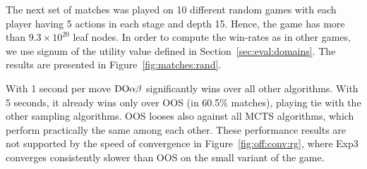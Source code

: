 The next set of matches was played on 10 different random games with each player having 5 actions in each stage and depth 15. Hence, the game has more than $9.3\times 10^{20}$ leaf nodes. In order to compute the win-rates as in other games, we use signum of the utility value defined in Section~\ref{sec:eval:domains}. The results are presented in Figure~\ref{fig:matches:rand}.

With 1 second per move $\textrm{DO}\alpha\beta$ significantly wins over all other algorithms. With 5 seconds, it already wins only over OOS (in 60.5\% matches), playing tie with the other sampling algorithms. OOS looses also against all MCTS algorithms, which perform practically the same among each other. These performance results are not supported by the speed of convergence in Figure~\ref{fig:off:conv:rg}, where Exp3 converges consistently slower than OOS on the small variant of the game.

